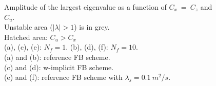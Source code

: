 \documentclass[a4paper,11pt]{article}
\begin{document}
\begin{figure}[!ht]
   \quad
   \caption{Amplitude of the largest eigenvalue as a function of $C_x\ =\ C_z$ and $C_u$.\\
       Unstable area ($\mid\lambda\mid >1$) is in grey.\\
       Hatched area: $C_u > C_x$ \\
       (a), (c), (e): $N_f = 1$. (b), (d), (f): $N_f = 10$.\\
       (a) and (b): reference FB scheme.\\
       (c) and (d): w-implicit FB scheme.\\
       (e) and (f): reference FB scheme with $\lambda_s = 0.1\ m^2/s$.}
   \label{Figstabadv}
\end{figure}


\end{document}
